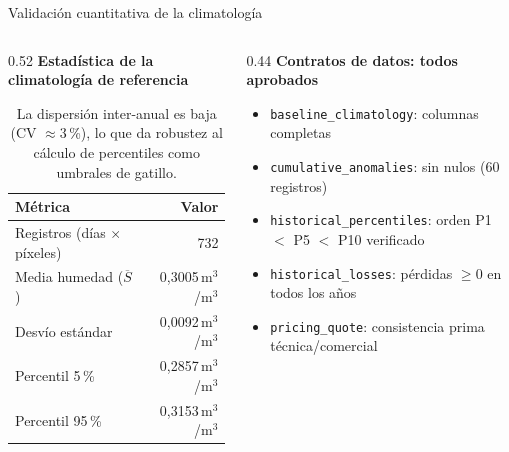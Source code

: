 \documentclass[aspectratio=169,11pt]{beamer}
\begin{document}
\begin{frame}{Validación cuantitativa de la climatología}
  \begin{columns}[T]
    \begin{column}{0.52\textwidth}
      {\footnotesize\bfseries Estadística de la climatología de referencia}
      \renewcommand{\arraystretch}{1.3}
      \begin{table}
        \centering
        \scriptsize
        \begin{tabular}{@{} l r @{}}
          \toprule
          \textbf{Métrica} & \textbf{Valor} \\
          \midrule
          Registros (días $\times$ píxeles) & 732 \\
          Media humedad ($\overline{S}$) & 0{,}3005\,m$^3$/m$^3$ \\
          Desvío estándar & 0{,}0092\,m$^3$/m$^3$ \\
          Percentil 5\,\% & 0{,}2857\,m$^3$/m$^3$ \\
          Percentil 95\,\% & 0{,}3153\,m$^3$/m$^3$ \\
          \bottomrule
        \end{tabular}
        \caption{La dispersión inter-anual es baja (CV $\approx 3$\,\%),
        lo que da robustez al cálculo de percentiles como umbrales de gatillo.}
      \end{table}
    \end{column}
    \begin{column}{0.44\textwidth}
      {\footnotesize\bfseries Contratos de datos: todos aprobados}
      \begin{itemize}\scriptsize
        \item[\textcolor{sgreen}{\checkmark}] \texttt{baseline\_climatology}: columnas completas
        \item[\textcolor{sgreen}{\checkmark}] \texttt{cumulative\_anomalies}: sin nulos (60 registros)
        \item[\textcolor{sgreen}{\checkmark}] \texttt{historical\_percentiles}: orden P1 $<$ P5 $<$ P10 verificado
        \item[\textcolor{sgreen}{\checkmark}] \texttt{historical\_losses}: pérdidas $\geq 0$ en todos los años
        \item[\textcolor{sgreen}{\checkmark}] \texttt{pricing\_quote}: consistencia prima técnica/comercial
      \end{itemize}
    \end{column}
  \end{columns}
\end{frame}
\end{document}
